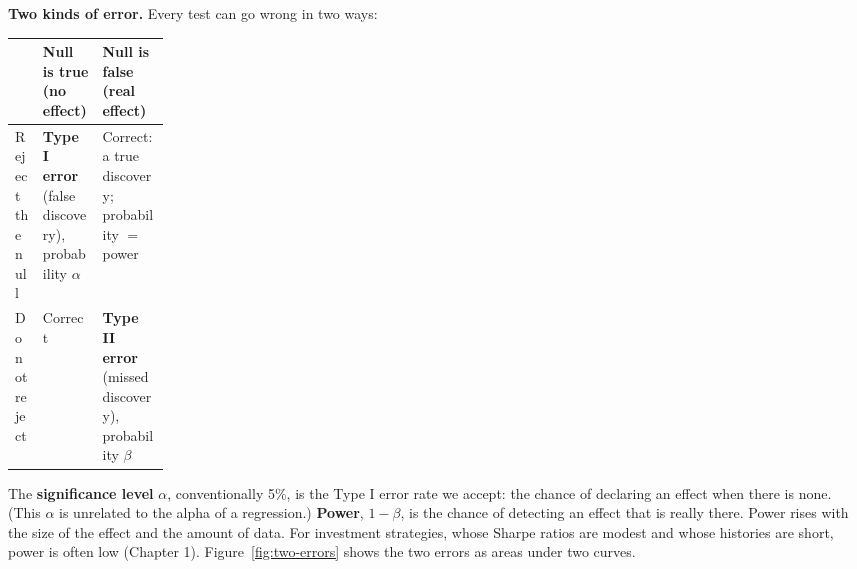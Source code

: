 \textbf{Two kinds of error.} Every test can go wrong in two ways:

\begin{center}
\small
\begin{tabularx}{0.9\linewidth}{@{}>{\raggedright\arraybackslash}p{0.18\linewidth}>{\raggedright\arraybackslash}X>{\raggedright\arraybackslash}X@{}}
\toprule
 & Null is true (no effect) & Null is false (real effect) \\
\midrule
Reject the null & \textbf{Type I error} (false discovery), probability $\alpha$ & Correct: a true discovery; probability $=$ power \\
Do not reject & Correct & \textbf{Type II error} (missed discovery), probability $\beta$ \\
\bottomrule
\end{tabularx}
\end{center}

The \textbf{significance level} $\alpha$, conventionally 5\%, is the Type I error rate we accept: the chance of declaring an effect when there is none. (This $\alpha$ is unrelated to the alpha of a regression.) \textbf{Power}, $1 - \beta$, is the chance of detecting an effect that is really there. Power rises with the size of the effect and the amount of data. For investment strategies, whose Sharpe ratios are modest and whose histories are short, power is often low (Chapter 1). 
Figure~\ref{fig:two-errors} shows the two errors as areas under two curves.


